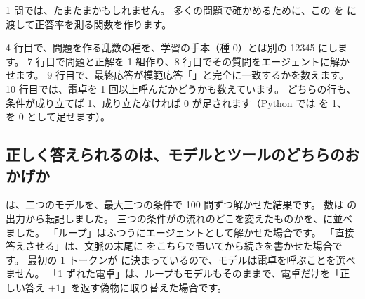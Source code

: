 1 問では、たまたまかもしれません。
多くの問題で確かめるために、この  を  に渡して正答率を測る関数を作ります。


4 行目で、問題を作る乱数の種を、学習の手本（種 0）とは別の 12345 にします。
7 行目で問題と正解を 1 組作り、8 行目でその質問をエージェントに解かせます。
9 行目で、最終応答が模範応答「」と完全に一致するかを数えます。
10 行目では、電卓を 1 回以上呼んだかどうかも数えています。
どちらの行も、条件が成り立てば 1、成り立たなければ 0 が足されます（Python では  を 1、 を 0 として足せます）。

\subsection{正しく答えられるのは、モデルとツールのどちらのおかげか}

は、二つのモデルを、最大三つの条件で 100 問ずつ解かせた結果です。
数は  の出力から転記しました。
三つの条件がの流れのどこを変えたものかを、に並べました。
「ループ」はふつうにエージェントとして解かせた場合です。
「直接答えさせる」は、文脈の末尾に  をこちらで置いてから続きを書かせた場合です。
最初の 1 トークンが  に決まっているので、モデルは電卓を呼ぶことを選べません。
「1 ずれた電卓」は、ループもモデルもそのままで、電卓だけを「正しい答え $+1$」を返す偽物に取り替えた場合です。

